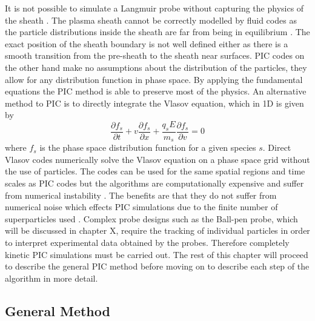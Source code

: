 It is not possible to simulate a Langmuir probe without capturing the physics of the sheath \cite{probe_sims_fluid}. The plasma sheath cannot be correctly modelled by fluid codes as the particle distributions inside the sheath are far from being in equilibrium \cite{krek}. The exact position of the sheath boundary is not well defined either as there is a smooth transition from the pre-sheath to the sheath near surfaces. PIC codes on the other hand make no assumptions about the distribution of the particles, they allow for any distribution function in phase space. By applying the fundamental equations the PIC method is able to preserve most of the physics. An alternative method to PIC is to directly integrate the Vlasov equation, which in 1D is given by
\begin{equation}
\frac{\partial f_s}{\partial t} + v \frac{\partial f_s}{\partial x} + \frac{q_s E}{m_s} \frac{\partial f_s}{\partial v} = 0 
\end{equation}
where $f_s$ is the phase space distribution function for a given species $s$.
Direct Vlasov codes numerically solve the Vlasov equation on a phase space grid without the use of particles. The codes can be used for the same spatial regions and time scales as PIC codes but the algorithms are computationally expensive and suffer from numerical instability \cite{soton}. The benefits are that they do not suffer from numerical noise which effects PIC simulations due to the finite number of superparticles used \cite{vlasov}. Complex probe designs such as the Ball-pen probe, which will be discussed in chapter X, require the tracking of individual particles in order to interpret experimental data obtained by the probes. Therefore completely kinetic PIC simulations must be carried out. The rest of this chapter will proceed to describe the general PIC method before moving on to describe each step of the algorithm in more detail. 





\subsection{General Method} 


